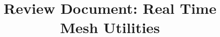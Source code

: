 \documentclass[a4paper, 11pt, ngerman, fleqn]{article}
\begin{document}
\title{Review Document: Real Time Mesh Utilities}
\vspace{3 in}
\maketitle
\clearpage





	
\end{document}
